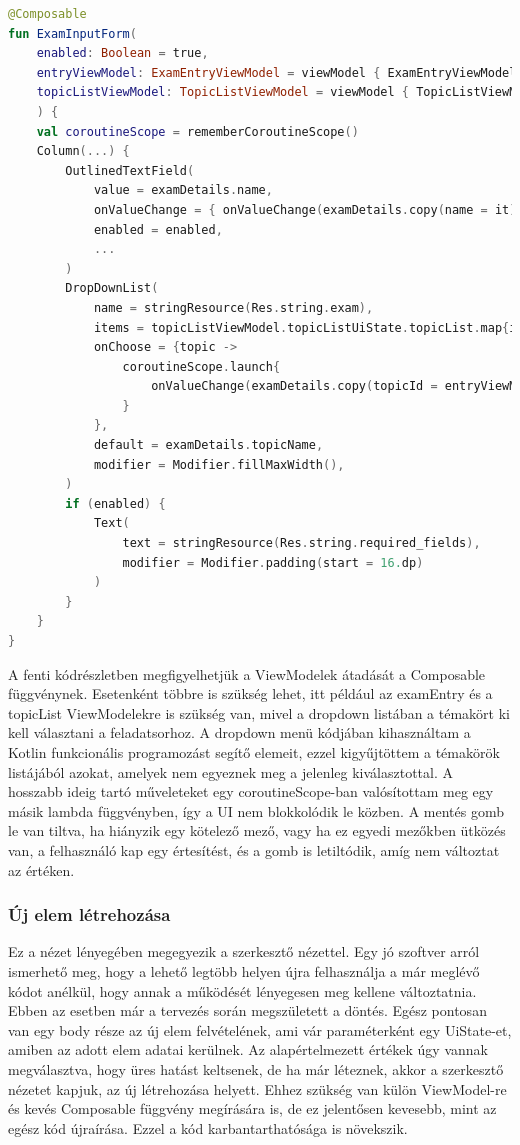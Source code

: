 \begin{lstlisting}[caption={Szerkesztő nézet kódja.}, label={lst:EditScreen}, language=Kotlin]
@Composable
fun ExamInputForm(
    enabled: Boolean = true,
    entryViewModel: ExamEntryViewModel = viewModel { ExamEntryViewModel() },    
    topicListViewModel: TopicListViewModel = viewModel { TopicListViewModel() },
    ) {
    val coroutineScope = rememberCoroutineScope()
    Column(...) {
        OutlinedTextField(
            value = examDetails.name,
            onValueChange = { onValueChange(examDetails.copy(name = it)) },
            enabled = enabled,
            ...
        )
        DropDownList(
            name = stringResource(Res.string.exam),
            items = topicListViewModel.topicListUiState.topicList.map{it.topic}.filterNot{ it == examDetails.topicName },
            onChoose = {topic ->
                coroutineScope.launch{
                    onValueChange(examDetails.copy(topicId = entryViewModel.getTopicIdByTopic(topic)))
                }
            },
            default = examDetails.topicName,
            modifier = Modifier.fillMaxWidth(),
        )
        if (enabled) {
            Text(
                text = stringResource(Res.string.required_fields),
                modifier = Modifier.padding(start = 16.dp)
            )
        }
    }
}
\end{lstlisting}

A fenti kódrészletben megfigyelhetjük a ViewModelek átadását a Composable függvénynek.
Esetenként többre is szükség lehet, itt például az examEntry és a topicList ViewModelekre is szükség van, mivel a dropdown listában a témakört ki kell választani a feladatsorhoz.
A dropdown menü kódjában kihasználtam a Kotlin funkcionális programozást segítő elemeit, ezzel kigyűjtöttem a témakörök listájából azokat, amelyek nem egyeznek meg a jelenleg kiválasztottal.
A hosszabb ideig tartó műveleteket egy coroutineScope-ban valósítottam meg egy másik lambda függvényben, így a UI nem blokkolódik le közben.
A mentés gomb le van tiltva, ha hiányzik egy kötelező mező, vagy ha ez egyedi mezőkben ütközés van, a felhasználó kap egy értesítést, és a gomb is letiltódik, amíg nem változtat az értéken.

\pagebreak

\subsubsection{Új elem létrehozása}

Ez a nézet lényegében megegyezik a szerkesztő nézettel.
Egy jó szoftver arról ismerhető meg, hogy a lehető legtöbb helyen újra felhasználja a már meglévő kódot anélkül, hogy annak a működését lényegesen meg kellene változtatnia.
Ebben az esetben már a tervezés során megszületett a döntés. Egész pontosan van egy body része az új elem felvételének, ami vár paraméterként egy UiState-et, amiben az adott elem adatai kerülnek.
Az alapértelmezett értékek úgy vannak megválasztva, hogy üres hatást keltsenek, de ha már léteznek, akkor a szerkesztő nézetet kapjuk, az új létrehozása helyett.
Ehhez szükség van külön ViewModel-re és kevés Composable függvény megírására is, de ez jelentősen kevesebb, mint az egész kód újraírása. Ezzel a kód karbantarthatósága is növekszik.

